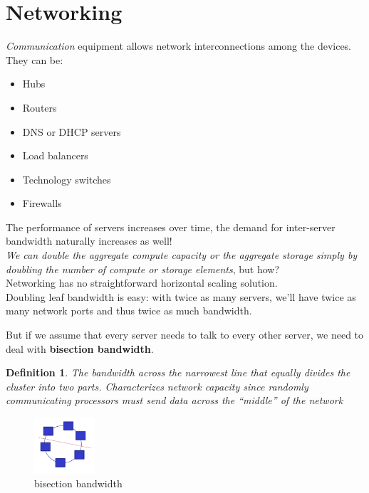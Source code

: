 \documentclass[10pt, oneside]{article}
\newtheorem{defn}{Definition}
\begin{document}
\newpage

\section{Networking}
{\sl Communication} equipment allows network interconnections among the devices.\\
They can be:
\begin{itemize}
    \item Hubs
    \item Routers
    \item DNS or DHCP servers
    \item Load balancers
    \item Technology switches
    \item Firewalls
\end{itemize}
The performance of servers increases over time, the demand for inter-server bandwidth naturally increases as well!\\
{\sl We can double the aggregate compute capacity or the aggregate storage simply by doubling the number of compute or storage elements}, but how?\\
Networking has no straightforward horizontal scaling solution.\\
Doubling leaf bandwidth is easy: with twice as many servers, we’ll have twice as many network ports and thus twice as much bandwidth.
\begin{multicols}{2}
\noindent
But if we assume that every server needs to talk to every other server, we need to deal with {\bf bisection bandwidth}. \begin{defn}The bandwidth across the narrowest line that equally divides the cluster into two parts. Characterizes network capacity since randomly communicating processors must send data across the “middle” of the network
\end{defn}
\columnbreak
\begin{figure}[H]
    \begin{center}
    \includegraphics[width=0.2\textwidth]{img/img21.png}
    \caption{bisection bandwidth}
    \label{fig:bisection bandwidth}
    \end{center}
\end{figure}
\end{multicols}
\end{document}
